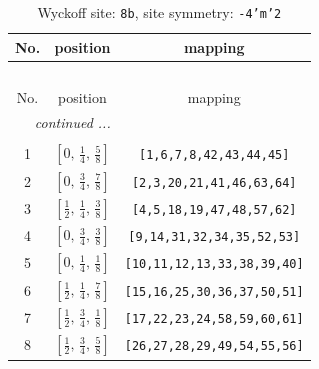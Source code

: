 \documentclass[fleqn,8pt]{jsarticle}
\begin{document}
\begin{longtable}{ccc}
\caption{Wyckoff site: {\tt 8b}, site symmetry: {\tt -4'm'2}}
 \\
 \hline \hline
No. & position & mapping \\ \hline \endfirsthead

\multicolumn{2}{l}{\tablename\ \thetable{}} \\
 \hline \hline
No. & position & mapping \\ \hline \endhead

 \hline \hline
\multicolumn{2}{r}{\footnotesize\it continued ...} \\ \endfoot

 \hline \hline
\multicolumn{2}{r}{} \\ \endlastfoot

1 & $\left[ 0,\, \frac{1}{4},\, \frac{5}{8} \right]$ & {\tt [1,6,7,8,42,43,44,45]} \\ \hline
2 & $\left[ 0,\, \frac{3}{4},\, \frac{7}{8} \right]$ & {\tt [2,3,20,21,41,46,63,64]} \\ \hline
3 & $\left[ \frac{1}{2},\, \frac{1}{4},\, \frac{3}{8} \right]$ & {\tt [4,5,18,19,47,48,57,62]} \\ \hline
4 & $\left[ 0,\, \frac{3}{4},\, \frac{3}{8} \right]$ & {\tt [9,14,31,32,34,35,52,53]} \\ \hline
5 & $\left[ 0,\, \frac{1}{4},\, \frac{1}{8} \right]$ & {\tt [10,11,12,13,33,38,39,40]} \\ \hline
6 & $\left[ \frac{1}{2},\, \frac{1}{4},\, \frac{7}{8} \right]$ & {\tt [15,16,25,30,36,37,50,51]} \\ \hline
7 & $\left[ \frac{1}{2},\, \frac{3}{4},\, \frac{1}{8} \right]$ & {\tt [17,22,23,24,58,59,60,61]} \\ \hline
8 & $\left[ \frac{1}{2},\, \frac{3}{4},\, \frac{5}{8} \right]$ & {\tt [26,27,28,29,49,54,55,56]} \\
\end{longtable}
\renewcommand{\arraystretch}{1.2}
\end{document}
